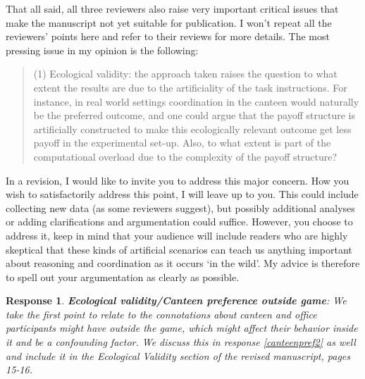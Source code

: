\documentclass[a4paper]{article}
\newtheorem{response}{Response}
\newenvironment{robin}{\smallskip \noindent \color{red!10!green!50!blue}}{\color{black}\smallskip}
\begin{document}
\medskip 
That all said, all three reviewers also raise very important critical issues that make the manuscript not yet suitable for publication. I won't repeat all the reviewers' points here and refer to their reviews for more details. The most pressing issue in my opinion is the following:
\begin{quote}
(1)    Ecological validity: the approach taken raises the question to what extent the results are due to the artificiality of the task instructions.
 For instance, in real world settings coordination in the canteen would naturally be the preferred outcome, and one could argue that the payoff structure is artificially constructed to make this ecologically relevant outcome get less payoff in the experimental set-up. Also, to what extent is part of the computational overload due to the complexity of the payoff structure?  
\end{quote}
In a revision, I would like to invite you to address this major concern. How you wish to satisfactorily address this point, I will leave up to you. This could include collecting new data (as some reviewers suggest), but possibly additional analyses or adding clarifications and argumentation could suffice. However, you choose to address it, keep in mind that your audience will include readers who are highly skeptical that these kinds of artificial scenarios can teach us anything important about reasoning and coordination as it occurs ‘in the wild’. My advice is therefore to spell out your argumentation as clearly as possible. 

\begin{response}\label{canteenpref}
{\bfseries Ecological validity/Canteen preference outside game}: We take the first point to relate to the connotations about canteen and office participants might have outside the game, which might affect their behavior inside it and be a confounding factor. We discuss this in response \ref{canteenpref2} as well and include it in the  Ecological Validity section of the revised manuscript, pages 15-16. 
\end{response}
\end{document}
